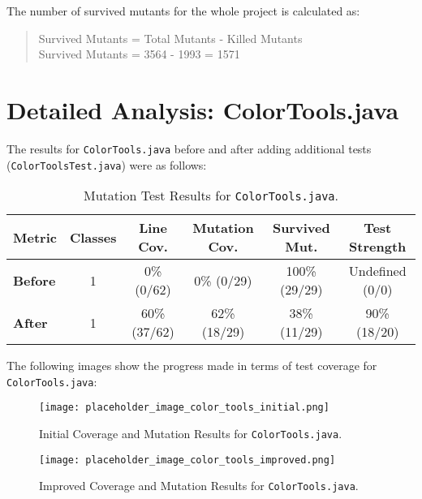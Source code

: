\documentclass[a4paper,12pt]{report}
\begin{document}
The number of survived mutants for the whole project is calculated as:

\begin{quote}
    Survived Mutants = Total Mutants - Killed Mutants \\
    Survived Mutants = 3564 - 1993 = 1571
\end{quote}

\section{Detailed Analysis: ColorTools.java}
The results for \texttt{ColorTools.java} before and after adding additional tests (\texttt{ColorToolsTest.java}) were as follows:

\begin{table}[H]
    \centering
    \begin{tabular}{|l|c|c|c|c|c|}
        \hline
        \textbf{Metric} & \textbf{Classes} & \textbf{Line Cov.} & \textbf{Mutation Cov.}& \textbf{Survived Mut.} & \textbf{Test Strength} \\ \hline
        \textbf{Before} & 1 & 0\% (0/62) & 0\% (0/29) & 100\% (29/29)  & Undefined (0/0) \\ \hline
        \textbf{After} & 1 & 60\% (37/62) & 62\% (18/29) & 38\% (11/29)  & 90\% (18/20) \\ \hline
    \end{tabular}
    \caption{Mutation Test Results for \texttt{ColorTools.java}.}
    \label{tab:mutation_results_color_tools}
\end{table}

\noindent The following images show the progress made in terms of test coverage for \texttt{ColorTools.java}:

\begin{figure}[H]
    \centering
    \texttt{[image: placeholder\_image\_color\_tools\_initial.png]} %
    \caption{Initial Coverage and Mutation Results for \texttt{ColorTools.java}.}
    \label{fig:color_tools_initial}
\end{figure}

\begin{figure}[H]
    \centering
    \texttt{[image: placeholder\_image\_color\_tools\_improved.png]} %
    \caption{Improved Coverage and Mutation Results for \texttt{ColorTools.java}.}
    \label{fig:color_tools_improved}
\end{figure}
\end{document}
